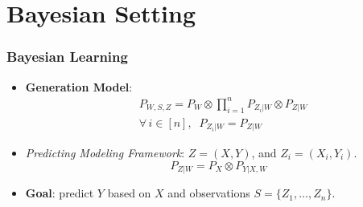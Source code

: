 \documentclass[usenames,dvipsnames, 10pt]{beamer}
\begin{document}
%	
\section{‌Bayesian Setting}

\begin{frame}
	\frametitle{‌Bayesian Learning}
	
	
	
	\vspace{0.4cm}
	
	\begin{itemize}
		\item \textbf{Generation Model}: 
			\begin{align*}
			&P_{W, S, Z} = P_W \otimes \prod_{i = 1}^{n} P_{Z_i|W} \otimes P_{Z|W}\\ &\forall\, i \in [n], \;\; P_{Z_i|W} = P_{Z|W}			
			\end{align*}
		
		
		\vspace{0.3cm}
		
		\item \textit{Predicting Modeling Framework}: $Z = (X, Y)$, and $Z_i = (X_i, Y_i)$.				
		$$P_{Z|W} = P_X \otimes P_{Y|X, W}$$
		
		
		
		\vspace{0.4cm}
		\pause
		\item \textbf{Goal}: predict $Y$ based on $X$ and observations $S = \{Z_1, \dots, Z_n\}$. 

	\end{itemize}
\end{frame}
\end{document}
